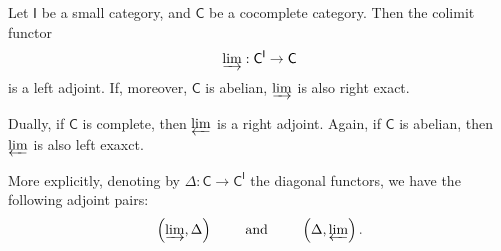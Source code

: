 \begin{prop}
	Let $\mathsf{I}$ be a small category, and $\mathsf{C}$ be a cocomplete category.
	Then the colimit functor
	\begin{equation}
	\varinjlim: \mathsf{C}^{\mathsf{I}} \to \mathsf{C}
	\end{equation} 
	is a left adjoint.
	If, moreover, $\mathsf{C}$ is abelian, $\varinjlim$ is also right exact.

	Dually, if $\mathsf{C}$ is complete, then $\varprojlim$	is a right adjoint.
	Again, if $\mathsf{C}$ is abelian, then $\varprojlim$ is also left exaxct.

	More explicitly, denoting by $\Delta\colon \mathsf{C} \to \mathsf{C}^{\mathsf{I}}$
	the diagonal functors, we have the following adjoint pairs:
	\begin{equation*}
	\left(\varinjlim, \Delta\right)
	\qquad \text{ and } \qquad
	\left(\Delta, \varprojlim\right)
	.\end{equation*}
\end{prop} 
